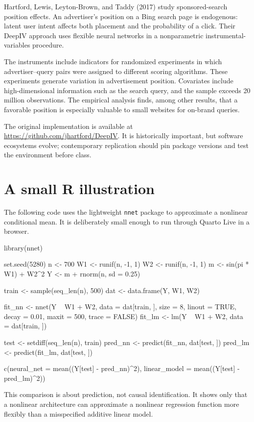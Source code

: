 Hartford, Lewis, Leyton-Brown, and Taddy (2017) study sponsored-search position
effects.  An advertiser's position on a Bing search page is endogenous: latent
user intent affects both placement and the probability of a click.  Their
DeepIV approach uses flexible neural networks in a nonparametric instrumental-
variables procedure.

The instruments include indicators for randomized experiments in which
advertiser--query pairs were assigned to different scoring algorithms.  These
experiments generate variation in advertisement position.  Covariates include
high-dimensional information such as the search query, and the sample exceeds
20 million observations.  The empirical analysis finds, among other results,
that a favorable position is especially valuable to small websites for
on-brand queries.

The original implementation is available at
\url{https://github.com/jhartford/DeepIV}.  It is historically important, but
software ecosystems evolve; contemporary replication should pin package
versions and test the environment before class.

\section{A small R illustration}
\label{sec:nn-r}

The following code uses the lightweight \texttt{nnet} package to approximate a
nonlinear conditional mean.  It is deliberately small enough to run through
Quarto Live in a browser.

\begin{rcode}
library(nnet)

set.seed(5280)
n <- 700
W1 <- runif(n, -1, 1)
W2 <- runif(n, -1, 1)
m <- sin(pi * W1) + W2^2
Y <- m + rnorm(n, sd = 0.25)

train <- sample(seq_len(n), 500)
dat <- data.frame(Y, W1, W2)

fit_nn <- nnet(Y ~ W1 + W2, data = dat[train, ],
               size = 8, linout = TRUE,
               decay = 0.01, maxit = 500, trace = FALSE)
fit_lm <- lm(Y ~ W1 + W2, data = dat[train, ])

test <- setdiff(seq_len(n), train)
pred_nn <- predict(fit_nn, dat[test, ])
pred_lm <- predict(fit_lm, dat[test, ])

c(neural_net = mean((Y[test] - pred_nn)^2),
  linear_model = mean((Y[test] - pred_lm)^2))
\end{rcode}

This comparison is about prediction, not causal identification.  It shows only
that a nonlinear architecture can approximate a nonlinear regression function
more flexibly than a misspecified additive linear model.

